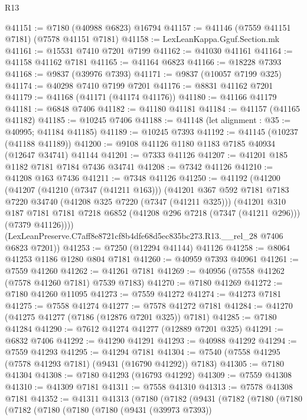 \begin{lexlean}{R13}
\begin{coremodule}
@41151 := @7180 (@40988 @6823) @16794
@41157 := @41146 (@7559 @41151 @7181) (@7578 @41151 @7181)
@41158 := LexLeanKappa.Gguf.Section.mk
@41161 := @15531 @7410 @7201 @7199
@41162 := @41030 @41161
@41164 := @41158 @41162 @7181
@41165 := @41164 @6823
@41166 := @18228 @7393
@41168 := @9837 (@39976 @7393)
@41171 := @9837 (@10057 @7199 @325)
@41174 := @40298 @7410 @7199 @7201
@41176 := @8831 @41162 @7201
@41179 := @41168 (@41171 (@41174 @41176))
@41180 := @41166 @41179
@41181 := @6848 @7406
@41182 := @41180 @41181
@41184 := @41157 (@41165 @41182)
@41185 := @10245 @7406
@41188 := @41148 (let alignment : @35 := @40995; @41184 @41185)
@41189 := @10245 @7393
@41192 := @41145 (@10237 (@41188 @41189))
@41200 := @9108 @41126 @1180 @1183 @7185 @40934 (@12647 @34741) @41144
@41201 := @7333 @41126
@41207 := @41201 @185 @1182 @7181 @7184 @7436 @34741
@41208 := @7342 @41126
@41210 := @41208 @163 @7436
@41211 := @7348 @41126
@41250 := @41192
    (@41200
      (@41207
        (@41210 (@7347 (@41211 @163)))
        (@41201
          @367
          @592
          @7181
          @7183
          @7220
          @34740
          (@41208 @325 @7220 (@7347 (@41211 @325)))
          (@41201
            @310
            @187
            @7181
            @7181
            @7218
            @6852
            (@41208 @296 @7218 (@7347 (@41211 @296)))
            (@7379 @41126))))
      (LexLeanPreserve.C7aff8e8721cf8b4dfe68d5ec835bc273.R13.__rel_28 @7406 @6823 @7201))
@41253 := @7250 (@12294 @41144) @41126
@41258 := @8064 @41253 @1186 @1280 @804 @7181
@41260 := @40959 @7393 @40961
@41261 := @7559 @41260
@41262 := @41261 @7181
@41269 := @40956 (@7558 @41262 (@7578 @41260 @7181) @7539 @7183)
@41270 := @7180 @41269
@41272 := @7180 @41260 @11095
@41273 := @7559 @41272
@41274 := @41273 @7181
@41275 := @7558 @41274
@41277 := @7578 @41272 @7181
@41284 := @41270 (@41275 @41277 (@7186 (@12876 @7201 @325)) @7181)
@41285 := @7180 @41284
@41290 := @7612 @41274 @41277 (@12889 @7201 @325)
@41291 := @6832 @7406
@41292 := @41290 @41291
@41293 := @40988 @41292
@41294 := @7559 @41293
@41295 := @41294 @7181
@41304 := @7540 (@7558 @41295 (@7578 @41293 @7181) (@9431 (@16790 @41292)) @7183)
@41305 := @7180 @41304
@41308 := @7180 @41293 (@16793 @41292)
@41309 := @7559 @41308
@41310 := @41309 @7181
@41311 := @7558 @41310
@41313 := @7578 @41308 @7181
@41352 := @41311
    @41313
    (@7180
      (@7182
        (@9431
          (@7182
            (@7180
              (@7180
                (@7182
                  (@7180
                    (@7180
                      (@7180
                        (@9431 (@39973 @7393))

\end{coremodule}
\end{lexlean}

